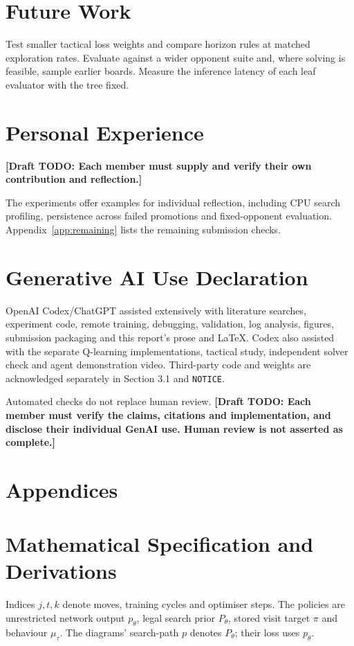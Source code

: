 \documentclass[letterpaper]{article}
\newcommand{\drafttodo}[1]{\textcolor{red!65!black}{\textbf{[Draft TODO: #1]}}}
\begin{document}
\section{Future Work}
Test smaller tactical loss weights and compare horizon rules at matched
exploration rates. Evaluate against a wider opponent suite and, where
solving is feasible, sample earlier boards. Measure the inference latency
of each leaf evaluator with the tree fixed.

\section{Personal Experience}
\drafttodo{Each member must supply and verify their own contribution and reflection.}

The experiments offer examples for individual reflection, including CPU
search profiling, persistence across failed promotions and fixed-opponent
evaluation. Appendix~\ref{app:remaining} lists the remaining submission checks.
\label{main-text-end}

\clearpage
\section*{Generative AI Use Declaration}
OpenAI Codex/ChatGPT assisted extensively with literature searches, experiment
code, remote training, debugging, validation, log analysis, figures, submission
packaging and this report's prose and LaTeX. Codex also assisted with the
separate Q-learning implementations, tactical study, independent solver check and
agent demonstration video. Third-party code and weights are
acknowledged separately in Section 3.1 and \texttt{NOTICE}.

Automated checks do not replace human review.
\drafttodo{Each member must verify the claims, citations and implementation,
and disclose their individual GenAI use. Human review is not asserted as complete.}

\begingroup\small
\setlength{\bibsep}{1pt plus 0.4pt}


\endgroup

\clearpage
\section*{Appendices}
\appendix
\section{Mathematical Specification and Derivations}
\label{app:mathematics}
Indices $j,t,k$ denote moves, training cycles and optimiser steps.
The policies are unrestricted network output $p_\theta$, legal search prior
$P_\theta$, stored visit target $\pi$ and behaviour $\mu_\tau$.
The diagrams' search-path $p$ denotes $P_\theta$; their loss uses $p_\theta$.
\end{document}
